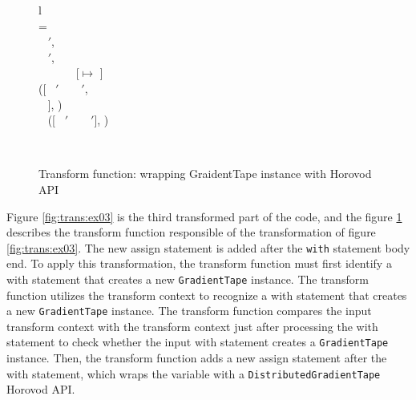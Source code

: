 \begin{figure}[ht!]
  \centering
  \begin{tabular}{l}
  \\
  \tstmt{\kwith ~ \mul{\nwithitem} ~ \kcolon ~ \mul{\nstmt}}{\smodenv} = \\
  \inden \ktlet ~ \mul{\nwithitem}$'$,  \kteq ~ \twwithitem{\mul{\nwithitem}}{\smodenv} \ktin \\
  \inden \ktlet ~ \mul{\nstmt}$'$,  \kteq ~  \ktin \\
  \inden \ktif ~  \envsub ~ \smodenv ~ \kteq ~ [\gtape $\mapsto$ \nid] ~ \ktthen\\
  \inden\inden ([\kwith ~ \mul{\nwithitem}$'$ ~ \kcolon ~ \mul{\nstmt}$'$, \\
  \inden\inden \nid ~ ], )\\
  \inden \ktelse ~ ([\kwith ~ \mul{\nwithitem}$'$ ~ \kcolon ~ \mul{\nstmt}$'$], )
\end{tabular}\\\vpar
  \caption{Transform function: wrapping GraidentTape instance with Horovod API}
  \label{fig:trans:fn03}
\end{figure}

Figure \ref{fig:trans:ex03} is the third transformed part of the code, and
the figure \ref{fig:trans:fn03} describes the transform function responsible 
of the transformation of figure \ref{fig:trans:ex03}.
The new assign statement is added after the {\tt with} statement body end.
To apply this transformation, the transform function must first identify
a with statement that creates a new {\tt GradientTape} instance. 
The transform function utilizes the transform context to recognize a
with statement that creates a new {\tt GradientTape} instance. 
The transform function compares the input transform context with the 
transform context just after processing the with statement to check
whether the input with statement creates a {\tt GradientTape} instance.
Then, the transform function adds a new assign statement after the 
with statement, which wraps the variable with a
{\tt DistributedGradientTape} Horovod API.


